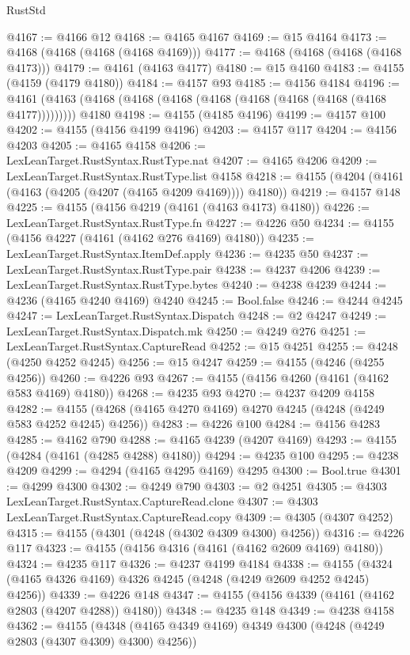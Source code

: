 \begin{lexlean}{RustStd}
\begin{coremodule}
{\begin{coremodule}
{{{{{{{{{{{{{{{{{{{{{{{{{{{{{{{{{{{{{{{{{{{{{{{{{{{{{{{{{{{{@4167 := @4166 @12
@4168 := @4165 @4167
@4169 := @15 @4164
@4173 := @4168 (@4168 (@4168 (@4168 @4169)))
@4177 := @4168 (@4168 (@4168 (@4168 @4173)))
@4179 := @4161 (@4163 @4177)
@4180 := @15 @4160
@4183 := @4155 (@4159 (@4179 @4180))
@4184 := @4157 @93
@4185 := @4156 @4184
@4196 := @4161 (@4163 (@4168 (@4168 (@4168 (@4168 (@4168 (@4168 (@4168 (@4168 @4177))))))))) @4180
@4198 := @4155 (@4185 @4196)
@4199 := @4157 @100
@4202 := @4155 (@4156 @4199 @4196)
@4203 := @4157 @117
@4204 := @4156 @4203
@4205 := @4165 @4158
@4206 := LexLeanTarget.RustSyntax.RustType.nat
@4207 := @4165 @4206
@4209 := LexLeanTarget.RustSyntax.RustType.list @4158
@4218 := @4155 (@4204 (@4161 (@4163 (@4205 (@4207 (@4165 @4209 @4169)))) @4180))
@4219 := @4157 @148
@4225 := @4155 (@4156 @4219 (@4161 (@4163 @4173) @4180))
@4226 := LexLeanTarget.RustSyntax.RustType.fn
@4227 := @4226 @50
@4234 := @4155 (@4156 @4227 (@4161 (@4162 @276 @4169) @4180))
@4235 := LexLeanTarget.RustSyntax.ItemDef.apply
@4236 := @4235 @50
@4237 := LexLeanTarget.RustSyntax.RustType.pair
@4238 := @4237 @4206
@4239 := LexLeanTarget.RustSyntax.RustType.bytes
@4240 := @4238 @4239
@4244 := @4236 (@4165 @4240 @4169) @4240
@4245 := Bool.false
@4246 := @4244 @4245
@4247 := LexLeanTarget.RustSyntax.Dispatch
@4248 := @2 @4247
@4249 := LexLeanTarget.RustSyntax.Dispatch.mk
@4250 := @4249 @276
@4251 := LexLeanTarget.RustSyntax.CaptureRead
@4252 := @15 @4251
@4255 := @4248 (@4250 @4252 @4245)
@4256 := @15 @4247
@4259 := @4155 (@4246 (@4255 @4256))
@4260 := @4226 @93
@4267 := @4155 (@4156 @4260 (@4161 (@4162 @583 @4169) @4180))
@4268 := @4235 @93
@4270 := @4237 @4209 @4158
@4282 := @4155 (@4268 (@4165 @4270 @4169) @4270 @4245 (@4248 (@4249 @583 @4252 @4245) @4256))
@4283 := @4226 @100
@4284 := @4156 @4283
@4285 := @4162 @790
@4288 := @4165 @4239 (@4207 @4169)
@4293 := @4155 (@4284 (@4161 (@4285 @4288) @4180))
@4294 := @4235 @100
@4295 := @4238 @4209
@4299 := @4294 (@4165 @4295 @4169) @4295
@4300 := Bool.true
@4301 := @4299 @4300
@4302 := @4249 @790
@4303 := @2 @4251
@4305 := @4303 LexLeanTarget.RustSyntax.CaptureRead.clone
@4307 := @4303 LexLeanTarget.RustSyntax.CaptureRead.copy
@4309 := @4305 (@4307 @4252)
@4315 := @4155 (@4301 (@4248 (@4302 @4309 @4300) @4256))
@4316 := @4226 @117
@4323 := @4155 (@4156 @4316 (@4161 (@4162 @2609 @4169) @4180))
@4324 := @4235 @117
@4326 := @4237 @4199 @4184
@4338 := @4155 (@4324 (@4165 @4326 @4169) @4326 @4245 (@4248 (@4249 @2609 @4252 @4245) @4256))
@4339 := @4226 @148
@4347 := @4155 (@4156 @4339 (@4161 (@4162 @2803 (@4207 @4288)) @4180))
@4348 := @4235 @148
@4349 := @4238 @4158
@4362 := @4155
    (@4348 (@4165 @4349 @4169) @4349 @4300 (@4248 (@4249 @2803 (@4307 @4309) @4300) @4256))
}}}}}}}}}}}}}}}}}}}}}}}}}}}}}}}}}}}}}}}}}}}}}}}}}}}}}}}}}}}}
\end{coremodule}}
\end{coremodule}
\end{lexlean}
